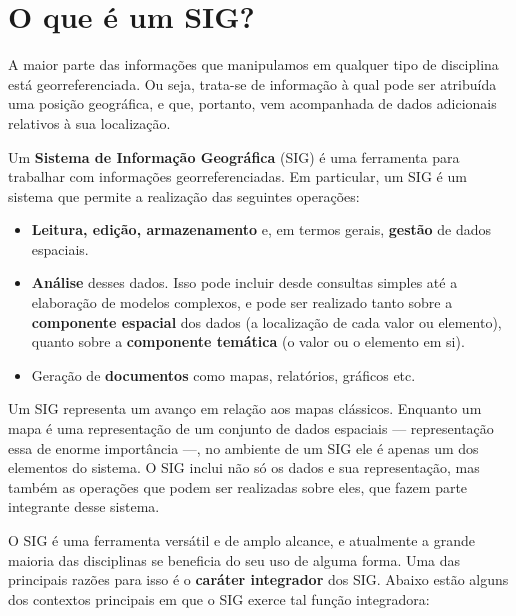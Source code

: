 
\chapter{O que é um SIG?}

\pagestyle{fancy}

A maior parte das informações que manipulamos em qualquer tipo de disciplina está georreferenciada. Ou seja, trata-se de informação à qual pode ser atribuída uma posição geográfica, e que, portanto, vem acompanhada de dados adicionais relativos à sua localização.

Um \textbf{Sistema de Informação Geográfica} (SIG) é uma ferramenta para trabalhar com informações georreferenciadas. Em particular, um SIG é um sistema que permite a realização das seguintes operações:

\begin{itemize}
	\item \textbf{Leitura, edição, armazenamento} e, em termos gerais, \textbf{gestão} de dados espaciais.
	\item \textbf{Análise} desses dados. Isso pode incluir desde consultas simples até a elaboração de modelos complexos, e pode ser realizado tanto sobre a \textbf{componente espacial} dos dados (a localização de cada valor ou elemento), quanto sobre a \textbf{componente temática} (o valor ou o elemento em si).
	\item Geração de \textbf{documentos} como mapas, relatórios, gráficos etc.
\end{itemize}

Um SIG representa um avanço em relação aos mapas clássicos. Enquanto um mapa é uma representação de um conjunto de dados espaciais — representação essa de enorme importância —, no ambiente de um SIG ele é apenas um dos elementos do sistema. O SIG inclui não só os dados e sua representação, mas também as operações que podem ser realizadas sobre eles, que fazem parte integrante desse sistema.

O SIG é uma ferramenta versátil e de amplo alcance, e atualmente a grande maioria das disciplinas se beneficia do seu uso de alguma forma. Uma das principais razões para isso é o \textbf{caráter integrador} dos SIG. Abaixo estão alguns dos contextos principais em que o SIG exerce tal função integradora:

